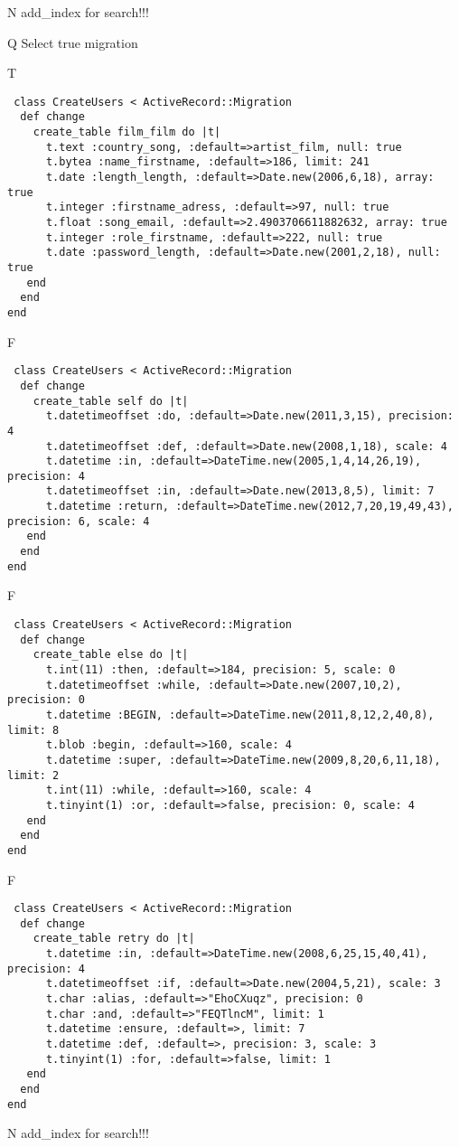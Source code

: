 N
add_index for search!!!
  
Q
Select true migration

T
\begin{verbatim}
 class CreateUsers < ActiveRecord::Migration 
  def change 
    create_table film_film do |t| 
      t.text :country_song, :default=>artist_film, null: true
      t.bytea :name_firstname, :default=>186, limit: 241
      t.date :length_length, :default=>Date.new(2006,6,18), array: true
      t.integer :firstname_adress, :default=>97, null: true
      t.float :song_email, :default=>2.4903706611882632, array: true
      t.integer :role_firstname, :default=>222, null: true
      t.date :password_length, :default=>Date.new(2001,2,18), null: true
   end 
  end 
end
\end{verbatim}

F
\begin{verbatim}
 class CreateUsers < ActiveRecord::Migration 
  def change 
    create_table self do |t| 
      t.datetimeoffset :do, :default=>Date.new(2011,3,15), precision: 4
      t.datetimeoffset :def, :default=>Date.new(2008,1,18), scale: 4
      t.datetime :in, :default=>DateTime.new(2005,1,4,14,26,19), precision: 4
      t.datetimeoffset :in, :default=>Date.new(2013,8,5), limit: 7
      t.datetime :return, :default=>DateTime.new(2012,7,20,19,49,43), precision: 6, scale: 4
   end 
  end 
end
\end{verbatim}

F
\begin{verbatim}
 class CreateUsers < ActiveRecord::Migration 
  def change 
    create_table else do |t| 
      t.int(11) :then, :default=>184, precision: 5, scale: 0
      t.datetimeoffset :while, :default=>Date.new(2007,10,2), precision: 0
      t.datetime :BEGIN, :default=>DateTime.new(2011,8,12,2,40,8), limit: 8
      t.blob :begin, :default=>160, scale: 4
      t.datetime :super, :default=>DateTime.new(2009,8,20,6,11,18), limit: 2
      t.int(11) :while, :default=>160, scale: 4
      t.tinyint(1) :or, :default=>false, precision: 0, scale: 4
   end 
  end 
end
\end{verbatim}

F
\begin{verbatim}
 class CreateUsers < ActiveRecord::Migration 
  def change 
    create_table retry do |t| 
      t.datetime :in, :default=>DateTime.new(2008,6,25,15,40,41), precision: 4
      t.datetimeoffset :if, :default=>Date.new(2004,5,21), scale: 3
      t.char :alias, :default=>"EhoCXuqz", precision: 0
      t.char :and, :default=>"FEQTlncM", limit: 1
      t.datetime :ensure, :default=>, limit: 7
      t.datetime :def, :default=>, precision: 3, scale: 3
      t.tinyint(1) :for, :default=>false, limit: 1
   end 
  end 
end
\end{verbatim}
N
add_index for search!!!
  
